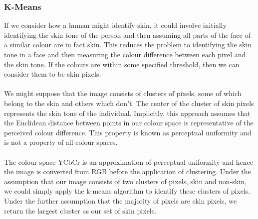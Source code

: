 \subsubsection{K-Means}
If we consider how a human might identify skin, it could involve initially identifying the skin tone of the person and then assuming all parts of the face of a similar colour are in fact skin. This reduces the problem to identifying the skin tone in a face and then measuring the colour difference between each pixel and the skin tone. If the colours are within some specified threshold, then we can consider them to be skin pixels.
\\ \\
We might suppose that the image consists of clusters of pixels, some of which belong to the skin and others which don't. The center of the cluster of skin pixels represents the skin tone of the individual. Implicitly, this approach assumes that the Euclidean distance between points in our colour space is representative of the perceived colour difference. This property is known as perceptual uniformity and is not a property of all colour spaces. 
\\ \\
The colour space YCbCr is an approximation of perceptual uniformity and hence the image is converted from RGB before the application of clustering. 
Under the assumption that our image consists of two clusters of pixels, skin and non-skin, we could simply apply 
the k-means algorithm to identify these clusters of pixels. Under the further assumption that the majority of pixels 
are skin pixels, we return the largest cluster as our set of skin pixels.
\\ \\

